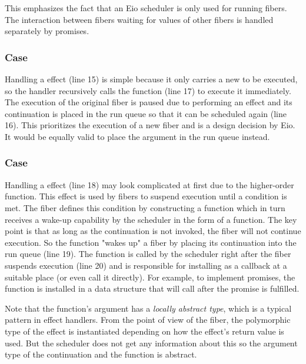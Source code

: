 This emphasizes the fact that an Eio scheduler is only used for running fibers.
The interaction between fibers waiting for values of other fibers is handled separately by promises.

\subsubsection*{\efork{} Case}
Handling a \efork{} effect (line 15) is simple because it only carries a new  to be executed, so the handler recursively calls the  function (line 17) to execute it immediately.
The execution of the original fiber is paused due to performing an effect and its continuation  is placed in the run queue so that it can be scheduled again (line 16).
This prioritizes the execution of a new fiber and is a design decision by Eio.
It would be equally valid to place the  argument in the run queue instead.

\subsubsection*{\esuspend{} Case}
Handling a \esuspend{} effect (line 18) may look complicated at first due to the higher-order  function.
This effect is used by fibers to suspend execution until a condition is met.
The fiber defines this condition by constructing a  function which in turn receives a wake-up capability by the scheduler in the form of a  function.
The key point is that as long as the continuation  is not invoked, the fiber will not continue execution.
So the  function "wakes up" a fiber by placing its continuation  into the run queue (line 19).
The  function is called by the scheduler right after the fiber suspends execution (line 20) and is responsible for installing  as a callback at a suitable place (or even call it directly).
For example, to implement promises, the  function is installed in a data structure that will call  after the promise is fulfilled.

Note that the  function's argument  has a \emph{locally abstract type}, which is a typical pattern in effect handlers.
From the point of view of the fiber, the polymorphic type  of the \esuspend{} effect is instantiated depending on how the effect's return value is used.
But the scheduler does not get any information about this so the argument type of the continuation  and the  function is abstract.

